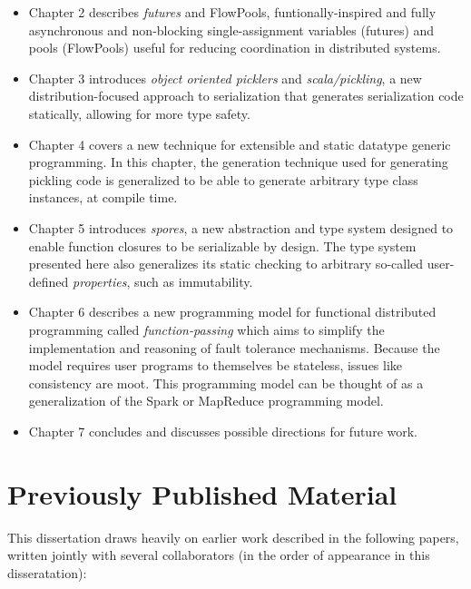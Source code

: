 \begin{itemize}

	\item Chapter 2 describes {\em futures} and {FlowPools}, funtionally-inspired
	and fully asynchronous and non-blocking single-assignment variables (futures)
	and pools (FlowPools) useful for reducing coordination in distributed systems.

	\item Chapter 3 introduces {\em object oriented picklers} and {\em
	scala/pickling}, a new distribution-focused approach to serialization that
	generates serialization code statically, allowing for more type safety.

	\item Chapter 4 covers a new technique for extensible and static datatype
	generic programming. In this chapter, the generation technique used for
	generating pickling code is generalized to be able to generate arbitrary type
	class instances, at compile time.

	\item Chapter 5 introduces {\em spores}, a new abstraction and type system
	designed to enable function closures to be serializable by design. The type
	system presented here also generalizes its static checking to arbitrary
	so-called user-defined {\em properties}, such as immutability.

	\item Chapter 6 describes a new programming model for functional distributed
	programming called {\em function-passing} which aims to simplify the
	implementation and reasoning of fault tolerance mechanisms. Because the model
	requires user programs to themselves be stateless, issues like consistency are
	moot. This programming model can be thought of as a generalization of the Spark
	or MapReduce programming model.

	\item Chapter 7 concludes and discusses possible directions for future work.

\end{itemize}

\section{Previously Published Material}

This dissertation draws heavily on earlier work described in the following
papers, written jointly with several collaborators (in the order of appearance
in this disseratation):


